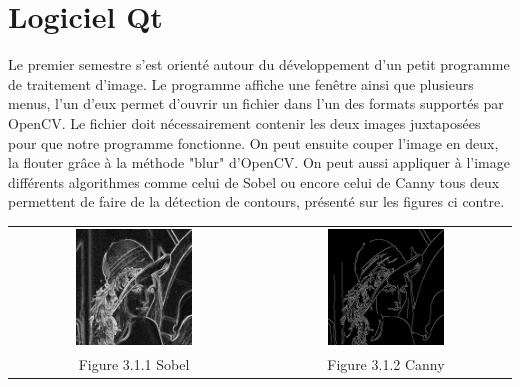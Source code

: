 \documentclass[12pt,a4paper]{report}
\begin{document}
\section{Logiciel Qt}
Le premier semestre s'est orienté autour du développement d'un petit programme de traitement d'image. Le programme affiche une fenêtre ainsi que plusieurs menus, l'un d'eux permet d'ouvrir un fichier dans l'un des formats supportés par OpenCV.
Le fichier doit nécessairement contenir les deux images juxtaposées pour que notre programme fonctionne. On peut ensuite couper l'image en deux, la flouter grâce à la méthode "blur" d'OpenCV. On peut aussi appliquer à l'image différents algorithmes comme celui de Sobel ou encore celui de Canny tous deux permettent de faire de la détection de contours, présenté sur les figures ci contre.
\begin{center}
\begin{tabular}{cc}
  \vspace{0pt} \includegraphics[width=0.49\textwidth]{sobel.jpg} &
  \vspace{0pt} \includegraphics[width=0.49\textwidth]{canny.jpg} \\
    
  Figure 3.1.1 Sobel & Figure 3.1.2 Canny
\end{tabular}
\end{center}
\end{document}
